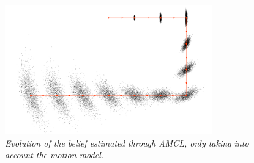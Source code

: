 \begin{description}
\begin{figure}
	\centering
	\includegraphics[width=0.8\textwidth]{Images/localization/motionModel.png}
	\caption{\textit{Evolution of the belief estimated through \ac{AMCL}, only taking into account the motion model.}}
	\label{fig:motionModelExample}
\end{figure}



\end{description}
